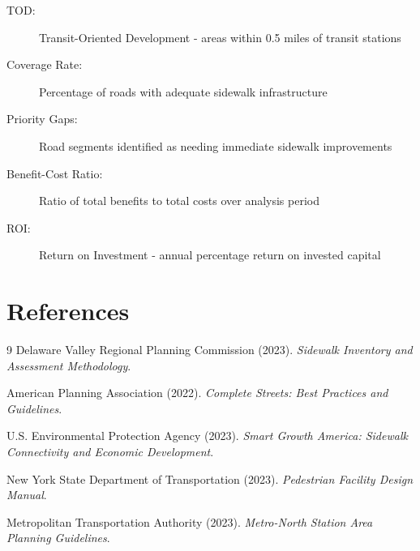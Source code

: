 \documentclass[11pt,letterpaper]{report}
\begin{document}
\begin{description}
    \item[TOD:] Transit-Oriented Development - areas within 0.5 miles of transit stations
    \item[Coverage Rate:] Percentage of roads with adequate sidewalk infrastructure
    \item[Priority Gaps:] Road segments identified as needing immediate sidewalk improvements
    \item[Benefit-Cost Ratio:] Ratio of total benefits to total costs over analysis period
    \item[ROI:] Return on Investment - annual percentage return on invested capital
\end{description}

\section{References}

\begin{thebibliography}{9}
 Delaware Valley Regional Planning Commission (2023). \emph{Sidewalk Inventory and Assessment Methodology}.

 American Planning Association (2022). \emph{Complete Streets: Best Practices and Guidelines}.

 U.S. Environmental Protection Agency (2023). \emph{Smart Growth America: Sidewalk Connectivity and Economic Development}.

 New York State Department of Transportation (2023). \emph{Pedestrian Facility Design Manual}.

 Metropolitan Transportation Authority (2023). \emph{Metro-North Station Area Planning Guidelines}.
\end{thebibliography}

\end{document}
